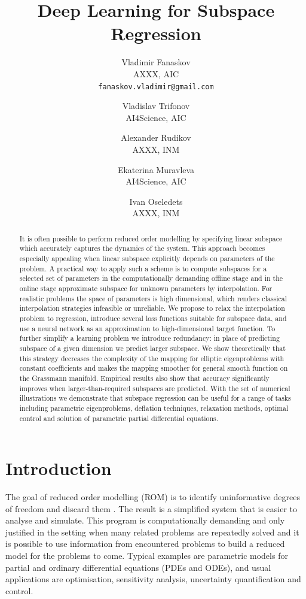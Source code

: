 \documentclass{article}
\title{Deep Learning for Subspace Regression}
\author{Vladimir Fanaskov\\
AXXX, AIC\\
\texttt{fanaskov.vladimir@gmail.com} \and
Vladislav Trifonov\\
AI4Science, AIC  \and 
Alexander Rudikov \\
AXXX, INM \and
Ekaterina Muravleva\\
AI4Science, AIC \and 
Ivan Oseledets\\
AXXX, INM
}
\date{}
\begin{document}
\maketitle

\begin{abstract}
It is often possible to perform reduced order modelling by specifying linear subspace which accurately captures the dynamics of the system. This approach becomes especially appealing when linear subspace explicitly depends on parameters of the problem. A practical way to apply such a scheme is to compute subspaces for a selected set of parameters in the computationally demanding offline stage and in the online stage approximate subspace for unknown parameters by interpolation. For realistic problems the space of parameters is high dimensional, which renders classical interpolation strategies infeasible or unreliable. We propose to relax the interpolation problem to regression, introduce several loss functions suitable for subspace data, and use a neural network as an approximation to high-dimensional target function. To further simplify a learning problem we introduce redundancy: in place of predicting subspace of a given dimension we predict larger subspace. We show theoretically that this strategy decreases the complexity of the mapping for elliptic eigenproblems with constant coefficients and makes the mapping smoother for general smooth function on the Grassmann manifold. Empirical results also show that accuracy significantly improves when larger-than-required subspaces are predicted. With the set of numerical illustrations we demonstrate that subspace regression can be useful for a range of tasks including parametric eigenproblems, deflation techniques, relaxation methods, optimal control and solution of parametric partial differential equations.
\end{abstract}

\section{Introduction}
The goal of reduced order modelling (ROM) is to identify uninformative degrees of freedom and discard them \cite{bai2005reduced}. The result is a simplified system that is easier to analyse and simulate. This program is computationally demanding and only justified in the setting when many related problems are repeatedly solved and it is possible to use information from encountered problems to build a reduced model for the problems to come. Typical examples are parametric models for partial and ordinary differential equations (PDEs and ODEs), and usual applications are optimisation, sensitivity analysis, uncertainty quantification and control.
\end{document}
